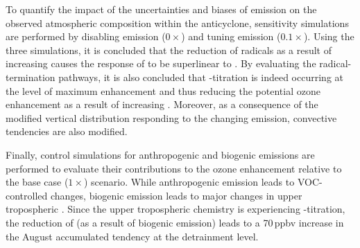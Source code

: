 To quantify the impact of the uncertainties and biases of {\lnox} emission on the observed atmospheric composition
within the anticyclone, sensitivity simulations are performed by disabling emission ($0\times$) and tuning emission
($0.1\times$). Using the three simulations, it is concluded that the reduction of  radicals as a result of
increasing  causes the response of  to be superlinear to {\lnox}. By evaluating the
radical-termination pathways, it is also concluded that -titration is indeed occurring at the level of
maximum  enhancement and thus reducing the potential ozone enhancement as a result of increasing
{\lnox}. Moreover, as a consequence of the modified vertical distribution responding to the changing {\lnox} emission,
convective tendencies are also modified.

Finally, control simulations for anthropogenic and biogenic emissions are performed to evaluate their contributions
to the ozone enhancement relative to the base case ($1\times$) scenario. While anthropogenic emission leads to
VOC-controlled changes, biogenic emission leads to major changes in upper tropospheric . Since the
upper tropospheric chemistry is experiencing -titration, the reduction of  (as a result of
biogenic emission) leads to a 70\,\unit{ppbv} increase in the August accumulated tendency at the detrainment level.